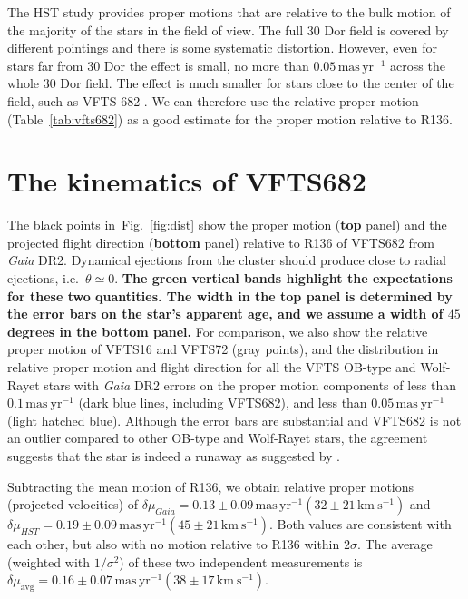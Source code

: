 \documentclass[a4paper,fleqn,usenatbib]{mnras}
\newcommand{\newtext}[1]{{\color{ForestGreen}\bf{#1}}}
\newcommand{\kms}{{\,\mathrm{km\ s^{-1}}}}
\newcommand{\masyr}{\,\mathrm{mas}\,\mathrm{yr}^{-1}}
\DeclareRobustCommand{\Figref}[1]{Fig.~\ref{#1}}
\DeclareRobustCommand{\Tabref}[1]{Table~\ref{#1}}
\begin{document}
The HST study provides proper motions that are relative to the bulk motion
of the majority of the stars in the field of view. The full 30 Dor
field is covered by different pointings and there is some systematic
distortion.  However, even for stars far from 30 Dor the effect is
small, no more than $0.05\masyr$ across the whole 30 Dor field. The
effect is much smaller for stars close to the center of the field, such as
VFTS 682 \citep{platais:18}.  We can therefore use the relative proper
motion (\Tabref{tab:vfts682}) as a good estimate for the proper motion relative to R136. 
 
\vspace{-30pt}
\section{The kinematics of VFTS682}
\label{sec:results}

The black points in~\Figref{fig:dist} show the proper motion 
(\newtext{top} panel) and the projected flight direction (\newtext{bottom} panel) relative
to R136 of
VFTS682 from \emph{Gaia} DR2. %
Dynamical ejections from the
cluster should %
produce close to radial ejections, i.e.~$\theta\simeq0$. \newtext{The green
vertical bands highlight the expectations for these two quantities. %
The width in the top panel is determined
by the error bars on the star's apparent age, and we assume a width of
$45$ degrees in the bottom panel.} For comparison, we also show the relative
proper motion of VFTS16 and VFTS72 (gray points), and the distribution
in relative proper motion and flight direction for all the VFTS OB-type and Wolf-Rayet stars with
\emph{Gaia} DR2 errors on the proper motion
components of less than $0.1\,\mathrm{mas\ yr^{-1}}$ (dark blue lines,
including VFTS682), and less than $0.05\,\mathrm{mas\ yr^{-1}}$ (light hatched
blue). Although the error bars are substantial and VFTS682 is not
an outlier compared to other OB-type and Wolf-Rayet stars, the agreement
suggests that the star is indeed a runaway as suggested by
\cite{bestenlehner:11}. 

Subtracting
the mean motion of R136, we obtain relative proper motions (projected
velocities) of $\delta \mu_{Gaia}=0.13\pm 0.09\masyr (32\pm 21\kms)$ and
$\delta \mu_{HST}=0.19\pm 0.09\masyr (45 \pm 21\kms )$. Both values
are consistent with each other, but also with no motion relative to R136
within $2\sigma$. The average (weighted with $1/\sigma^2$) of these two independent
measurements is $\delta \mu_\mathrm{avg}=0.16\pm0.07\masyr
(38\pm17\kms)$. 
\end{document}
